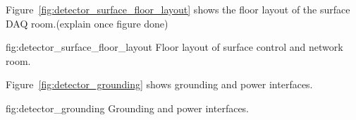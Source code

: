 Figure~\ref{fig:detector_surface_floor_layout} shows the floor layout
of the surface DAQ room.(explain once figure done)
\begin{dunefigure}{fig:detector_surface_floor_layout} {Floor layout of surface control and network room.}
\end{dunefigure}
Figure~\ref{fig:detector_grounding} shows grounding and power interfaces.
\begin{dunefigure}{fig:detector_grounding} {Grounding and power interfaces.}
\end{dunefigure}




